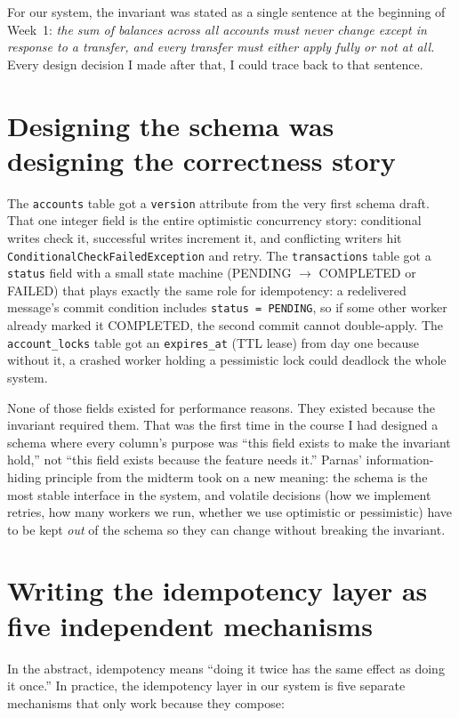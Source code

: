 \documentclass[11pt,a4paper]{article}
\begin{document}
\begin{insightbox}
For our system, the invariant was stated as a single sentence at the beginning of Week~1: \textit{the sum of balances across all accounts must never change except in response to a transfer, and every transfer must either apply fully or not at all.} Every design decision I made after that, I could trace back to that sentence.
\end{insightbox}

\section{Designing the schema was designing the correctness story}

The \texttt{accounts} table got a \texttt{version} attribute from the very first schema draft. That one integer field is the entire optimistic concurrency story: conditional writes check it, successful writes increment it, and conflicting writers hit \texttt{ConditionalCheckFailedException} and retry. The \texttt{transactions} table got a \texttt{status} field with a small state machine (PENDING $\rightarrow$ COMPLETED or FAILED) that plays exactly the same role for idempotency: a redelivered message's commit condition includes \texttt{status = PENDING}, so if some other worker already marked it COMPLETED, the second commit cannot double-apply. The \texttt{account\_locks} table got an \texttt{expires\_at} (TTL lease) from day one because without it, a crashed worker holding a pessimistic lock could deadlock the whole system.

None of those fields existed for performance reasons. They existed because the invariant required them. That was the first time in the course I had designed a schema where every column's purpose was ``this field exists to make the invariant hold,'' not ``this field exists because the feature needs it.'' Parnas' information-hiding principle from the midterm took on a new meaning: the schema is the most stable interface in the system, and volatile decisions (how we implement retries, how many workers we run, whether we use optimistic or pessimistic) have to be kept \textit{out} of the schema so they can change without breaking the invariant.

\section{Writing the idempotency layer as five independent mechanisms}

In the abstract, idempotency means ``doing it twice has the same effect as doing it once.'' In practice, the idempotency layer in our system is five separate mechanisms that only work because they compose:
\end{document}
